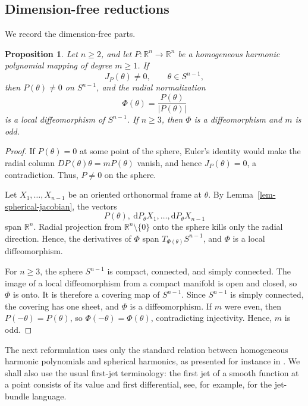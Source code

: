 \documentclass[10pt]{amsart}
\numberwithin{equation}{section}
\newtheorem{proposition}[theorem]{Proposition}
\theoremstyle{definition}
\newcommand{\R}{\mathbb R}
\begin{document}
\subsection{Dimension-free reductions}

We record the dimension-free parts.

\begin{proposition}
Let \(n\ge2\), and let \(P:\R^n\to\R^n\) be a homogeneous harmonic
polynomial mapping of degree \(m\ge1\). If
\[
        J_P(\theta)\ne0,
        \qquad
        \theta\in S^{n-1},
\]
then \(P(\theta)\ne0\) on \(S^{n-1}\), and the radial normalization
\[
        \Phi(\theta)=\frac{P(\theta)}{|P(\theta)|}
\]
is a local diffeomorphism of \(S^{n-1}\). If \(n\ge3\), then \(\Phi\) is a
diffeomorphism and \(m\) is odd.
\end{proposition}

\begin{proof}
If \(P(\theta)=0\) at some point of the sphere, Euler's identity would make
the radial column \(DP(\theta)\theta=mP(\theta)\) vanish, and hence
\(J_P(\theta)=0\), a contradiction. Thus, \(P\ne0\) on the sphere.

Let \(X_1,\ldots,X_{n-1}\) be an oriented orthonormal frame at \(\theta\). By
Lemma~\ref{lem-spherical-jacobian}, the vectors
\[
        P(\theta),\ \mathrm{d}P_\theta X_1,\ldots,\mathrm{d}P_\theta X_{n-1}
\]
span \(\R^n\). Radial projection from \(\R^n\setminus\{0\}\) onto the sphere
kills only the radial direction. Hence, the derivatives of \(\Phi\) span
\(T_{\Phi(\theta)}S^{n-1}\), and \(\Phi\) is a local diffeomorphism.

For \(n\ge3\), the sphere \(S^{n-1}\) is compact, connected, and simply
connected. The image of a local diffeomorphism from a compact manifold is
open and closed, so \(\Phi\) is onto. It is therefore a covering map of
\(S^{n-1}\). Since \(S^{n-1}\) is simply connected, the covering has one
sheet, and \(\Phi\) is a diffeomorphism. If \(m\) were even, then
\(P(-\theta)=P(\theta)\), so \(\Phi(-\theta)=\Phi(\theta)\), contradicting
injectivity. Hence, \(m\) is odd.
\end{proof}

The next reformulation uses only the standard relation between homogeneous
harmonic polynomials and spherical harmonics, as presented for instance in
\cite{AxlerBourdonRamey}. We shall also use the usual first-jet terminology:
the first jet of a smooth function at a point consists of its value and first
differential, see, for example, \cite{Saunders} for the jet-bundle language.
\end{document}
